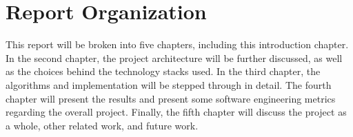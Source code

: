 \section{Report Organization}
\label{sect:report-organization}
This report will be broken into five chapters, including this introduction
chapter.  In the second chapter, the project architecture will be further
discussed, as well as the choices behind the technology stacks used.  In the
third chapter, the algorithms and implementation will be stepped through in
detail.  The fourth chapter will present the results and present some software
engineering metrics regarding the overall project.  Finally, the fifth chapter
will discuss the project as a whole, other related work, and future work.
